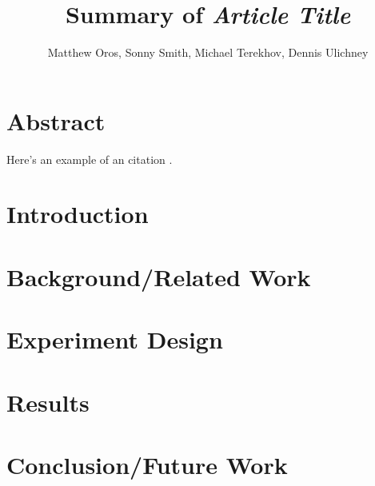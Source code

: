 \documentclass[sigsmall]{acmart}
\title{Summary of \emph{Article Title}}
\author{Matthew Oros, Sonny Smith, Michael Terekhov, Dennis Ulichney}
\begin{document}
\maketitle

\section*{Abstract}
Here's an example of an citation \cite{hopper:compilers101}.

\section*{Introduction}

\section*{Background/Related Work}

\section*{Experiment Design}

\section*{Results}

\section*{Conclusion/Future Work}




\end{document}
